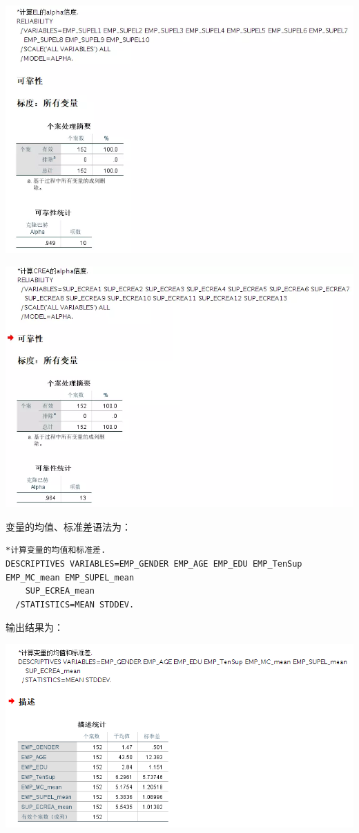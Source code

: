 \documentclass[
]{book}
\begin{document}
\includegraphics{figs/1313.png}

\includegraphics{figs/1314.png}

变量的均值、标准差语法为：

\begin{verbatim}
*计算变量的均值和标准差.
DESCRIPTIVES VARIABLES=EMP_GENDER EMP_AGE EMP_EDU EMP_TenSup EMP_MC_mean EMP_SUPEL_mean 
    SUP_ECREA_mean
  /STATISTICS=MEAN STDDEV.
\end{verbatim}

输出结果为：

\includegraphics{figs/1315.png}
\end{document}
